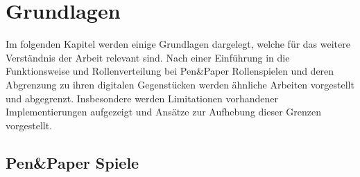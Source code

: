 \chapter{Grundlagen}
\label{background}

Im folgenden Kapitel werden einige Grundlagen dargelegt, welche für das weitere Verständnis der Arbeit relevant sind. Nach einer Einführung in die Funktionsweise und Rollenverteilung bei Pen\&Paper Rollenspielen und deren Abgrenzung zu ihren digitalen Gegenstücken werden ähnliche Arbeiten vorgestellt und abgegrenzt. Insbesondere werden Limitationen vorhandener Implementierungen aufgezeigt und Ansätze zur Aufhebung dieser Grenzen vorgestellt.




\section{Pen\&Paper Spiele}
\label{sec:PenPaperSpiele}



